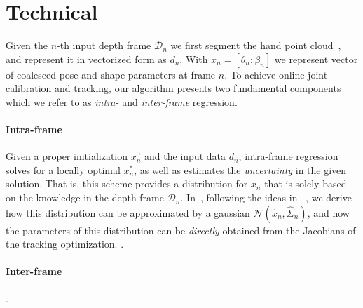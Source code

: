 \section{Technical}
Given the $n$-th input depth frame $\mathcal{D}_n$ we first segment the hand point cloud~\cite{htrack}, and represent it in vectorized form as $d_n$. With $x_n = [\theta_n; \beta_n]$ we represent vector of coalesced pose and shape parameters at frame $n$. To achieve online joint calibration and tracking, our algorithm presents two fundamental components which we refer to as \emph{intra-} and \emph{inter-frame} regression.

\paragraph{Intra-frame}
Given a proper initialization $x_n^0$ and the input data $d_n$, intra-frame regression solves for a locally optimal $x_n^*$, as well as estimates the \emph{uncertainty} in the given solution. That is, this scheme provides a distribution for $x_n$ that is solely based on the knowledge in the depth frame $\mathcal{D}_n$. In~, following the ideas in ~, we derive how this distribution can be approximated by a gaussian $\mathcal{N}(\hat{x}_n, \hat{\Sigma}_n)$, and how the parameters of this distribution can be \emph{directly} obtained from the Jacobians of the tracking optimization. .

\paragraph{Inter-frame}


.


